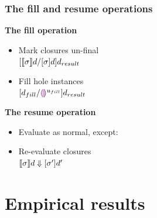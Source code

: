 \documentclass{beamer}
\begin{document}
\begin{frame}
  \frametitle{The fill and resume operations}

  \centering
  \begin{minipage}[t]{.45\textwidth}
    \textbf{The fill operation}

    \begin{itemize}
    \item Mark closures un-final \\ $[\llbracket\sigma\rrbracket d/[\sigma]d]d_{result}$
    \item Fill hole instances \\ $[d_{fill}/\textcolor{violet}{\llparenthesis}\textcolor{violet}{\rrparenthesis}^{u_{fill}}]d_{result}$
    \end{itemize}
  \end{minipage}
  \qquad
  \begin{minipage}[t]{.45\textwidth}
    \textbf{The resume operation}

    \begin{itemize}
    \item Evaluate as normal, except:
    \item Re-evaluate closures \\ $\llbracket\sigma\rrbracket d\Downarrow [\sigma']d'$
    \end{itemize}
  \end{minipage}
\end{frame}

\section{Empirical results}
\end{document}
